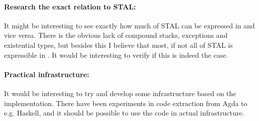 \paragraph{Research the exact relation to STAL:}
It might be interesting to see exactly how much of STAL can be expressed in
\ATAL and vice versa. There is the obvious lack of compound stacks,
exceptions and existential types, but besides this I believe that most, if not all of STAL is
expressible in \ATAL. It would be interesting to verify if this is indeed the
case.

\paragraph{Practical infrastructure:}
It would be interesting to try and develop some infrastructure based on the
implementation. There have been experiments in code extraction from Agda to
e.g. Haskell, and it should be possible to use the code in actual
infrastructure.
